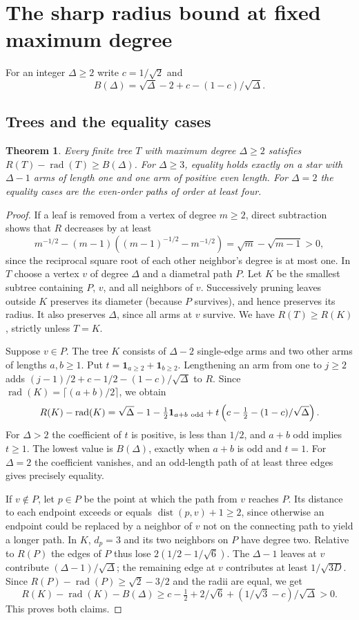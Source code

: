 \documentclass[11pt,a4paper]{article}
\newtheorem{theorem}{Theorem}[section]
\begin{document}
\section{The sharp radius bound at fixed maximum degree}\label{p05-sec:broom}
For an integer $\Delta\ge2$ write $c=1/\sqrt2$ and
\[
 B(\Delta)=\sqrt{\Delta}-2+c-(1-c)/\sqrt{\Delta}.
\]
\subsection{Trees and the equality cases}
\begin{theorem}\label{p05-thm:broomtree}
Every finite tree $T$ with maximum degree $\Delta\ge2$ satisfies
$R(T)-\operatorname{rad}(T)\ge B(\Delta)$.
For $\Delta\ge3$, equality holds exactly on a star with $\Delta-1$ arms of length one
and one arm of positive even length. For $\Delta=2$ the equality cases are
the even-order paths of order at least four.
\end{theorem}
\begin{proof}
If a leaf is removed from a vertex of degree $m\ge2$, direct subtraction
shows that $R$ decreases by at least
\[
 m^{-1/2}-(m-1)((m-1)^{-1/2}-m^{-1/2})
   =\sqrt m-\sqrt{m-1}>0,
\]
since the reciprocal square root of each other neighbor's degree is at
most one. In $T$ choose a vertex $v$ of degree $\Delta$ and a diametral path $P$.
Let $K$ be the smallest subtree containing $P$, $v$, and all neighbors of
$v$. Successively pruning leaves outside $K$ preserves its diameter (because
$P$ survives), and hence preserves its radius. It also preserves $\Delta$, since
all arms at $v$ survive. We have $R(T)\ge R(K)$, strictly unless $T=K$.

Suppose $v\in P$. The tree $K$ consists of $\Delta-2$ single-edge arms and two
other arms of lengths $a,b\ge1$. Put $t=\mathbf{1}_{a\ge2}+\mathbf{1}_{b\ge2}$.
Lengthening an arm from one to $j\ge2$ adds
$(j-1)/2+c-1/2-(1-c)/\sqrt{\Delta}$ to $R$. Since
$\operatorname{rad}(K)=\lceil(a+b)/2\rceil$, we obtain
\[
 R(K)-\operatorname{rad}(K)=
 \sqrt{\Delta}-1-\tfrac12\mathbf{1}_{a+b\ {\rm odd}}
  +t\left(c-\tfrac12-(1-c)/\sqrt{\Delta}\right).
\]
For $\Delta>2$ the coefficient of $t$ is positive, is less than $1/2$, and
$a+b$ odd implies $t\ge1$. The lowest value is $B(\Delta)$, exactly when
$a+b$ is odd and $t=1$. For $\Delta=2$ the coefficient vanishes, and an
odd-length path of at least three edges gives precisely equality.

If $v\notin P$, let $p\in P$ be the point at which the path from $v$
reaches $P$. Its distance to each endpoint exceeds or equals
$\operatorname{dist}(p,v)+1\ge2$, since otherwise an endpoint could
be replaced by a neighbor of $v$ not on the connecting path to yield
a longer path. In $K$, $d_p=3$ and its two neighbors on $P$ have
degree two. Relative to $R(P)$ the edges of $P$ thus lose
$2(1/2-1/\sqrt6)$. The $\Delta-1$ leaves at $v$ contribute
$(\Delta-1)/\sqrt{\Delta}$; the remaining edge at $v$ contributes at least
$1/\sqrt{3D}$. Since $R(P)-\operatorname{rad}(P)\ge\sqrt2-3/2$
and the radii are equal, we get
\[
 R(K)-\operatorname{rad}(K)-B(\Delta)
 \ge c-\tfrac12+2/\sqrt6+(1/\sqrt3-c)/\sqrt{\Delta}>0 .
\]
This proves both claims.
\end{proof}
\end{document}
